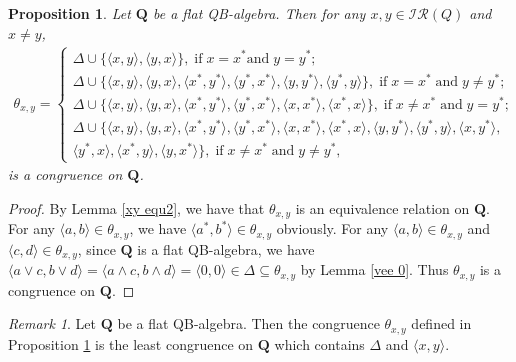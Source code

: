 \documentclass[12pt]{amsart}
\newtheorem{proposition}{Proposition}[section]
\theoremstyle{definition}
\theoremstyle{remark}
\newtheorem{remark}{Remark}[section]
\numberwithin{equation}{section}
\begin{document}
\begin{proposition}\label{xy con2}
Let $\mathbf{Q}$ be a flat QB-algebra. Then for any $x,y\in \mathscr{IR}(Q)$ and $x\neq y$,
\begin{eqnarray*}
\theta_{x,y}= \left\{
          \begin{array}{ll}
      \Delta \cup \{\langle x,y\rangle, \langle y,x\rangle \}, \;\mathrm{if}\;x=x^{\ast}\mathrm{and}\; y= y^{\ast};\\
      \Delta \cup \{\langle x,y\rangle, \langle y,x\rangle, \langle x^{\ast},y^{\ast}\rangle, \langle y^{\ast},x^{\ast}\rangle,\langle y,y^{\ast}\rangle,\langle y^{\ast},y\rangle \},\;\mathrm{if}\; x=x^{\ast}\; \mathrm{and}\; y\neq y^{\ast};\\
      \Delta \cup \{\langle x,y\rangle, \langle y,x\rangle, \langle x^{\ast},y^{\ast}\rangle, \langle y^{\ast},x^{\ast}\rangle,\langle x,x^{\ast}\rangle,\langle x^{\ast},x\rangle \},\;\mathrm{if}\; x\neq x^{\ast}\; \mathrm{and}\; y= y^{\ast};\\
      \Delta \cup \{\langle x,y\rangle, \langle y,x\rangle, \langle x^{\ast},y^{\ast}\rangle, \langle y^{\ast},x^{\ast}\rangle,\langle x,x^{\ast}\rangle,\langle x^{\ast},x\rangle,\langle y,y^{\ast}\rangle,\langle y^{\ast},y\rangle,\langle x,y^{\ast}\rangle,\\ \langle y^{\ast},x\rangle,\langle x^{\ast},y\rangle,\langle y,x^{\ast}\rangle \},\;\mathrm{if}\; x\neq x^{\ast}\; \mathrm{and}\; y\neq y^{\ast},
          \end{array}
        \right.
\end{eqnarray*}
is a congruence on $\mathbf{Q}$.
\end{proposition}

\begin{proof}
By Lemma \ref{xy equ2}, we have that $\theta_{x,y}$ is an equivalence relation on $\mathbf{Q}$. For any $\langle a,b\rangle\in \theta_{x,y}$, we have $\langle a^{\ast},b^{\ast}\rangle\in \theta_{x,y}$ obviously. For any $\langle a,b\rangle\in \theta_{x,y}$ and $\langle c,d\rangle\in \theta_{x,y}$, since $\mathbf{Q}$ is a flat QB-algebra, we have $\langle a\vee c,b\vee d\rangle=\langle a\wedge c,b\wedge d\rangle=\langle 0,0\rangle\in \Delta \subseteq \theta_{x,y}$ by Lemma \ref{vee 0}. Thus $\theta_{x,y}$ is a congruence on $\mathbf{Q}$.
\end{proof}


\begin{remark} Let $\mathbf{Q}$ be a flat QB-algebra. Then the congruence $\theta_{x,y}$ defined in Proposition \ref{xy con2} is the least congruence on $\mathbf{Q}$
which contains $\Delta$ and $\langle x,y\rangle$.
\end{remark}
\end{document}
